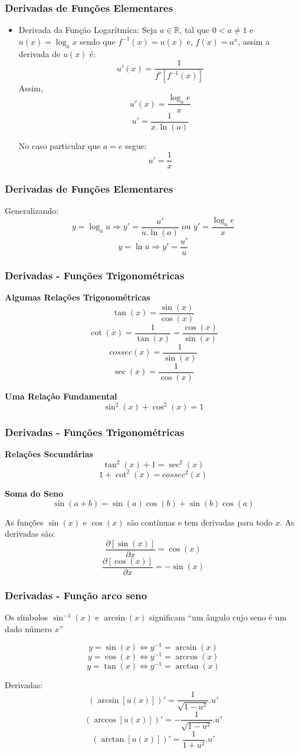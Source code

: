 \documentclass[hyperref={pdfpagelabels=false}]{beamer}
\begin{document}
\begin{frame}
\frametitle{Derivadas de Funções Elementares}
\begin{itemize}
 \item Derivada da Função Logarítmica: \pause Seja $a \in \mathbb{R}$, tal que $0 < a \neq 1$ e $u(x) = \log_{a}x$ sendo que $f^{-1}(x) = u(x)$ e, $f(x) = a^x$, assim a derivada de $u(x)$ é: $$u'(x) = \frac{1}{f'[f^{-1}(x)]}$$ \pause 
 Assim, $$u'(x) = \frac{\log_{a}e}{x}$$ $$u' = \frac{1}{x.\ln(a)}$$

No caso particular que $a = e$ segue: $$u' = \frac{1}{x}$$

\end{itemize}


\end{frame}

\begin{frame}
\frametitle{Derivadas de Funções Elementares}
Generalizando:
$$y = \log_{a}u \Rightarrow y' = \frac{u'}{u.\ln(a)} \text{ ou } y' = \frac{\log_{a}e}{x}$$ 
$$ y = \ln u \Rightarrow y' = \frac{u'}{u}$$

\end{frame}

\begin{frame}
\frametitle{Derivadas - Funções Trigonométricas}
{\bf Algumas Relações Trigonométricas}
$$\tan(x) = \frac{\sin(x)}{\cos(x)}$$
$$\cot(x) = \frac{1}{\tan(x)} = \frac{\cos(x)}{\sin(x)}$$
$$cossec(x) = \frac{1}{\sin(x)}$$
$$\sec(x) = \frac{1}{\cos(x)}$$

{\bf Uma Relação Fundamental}
$$\sin^2(x) + \cos^2(x) = 1$$

\end{frame}

\begin{frame}
\frametitle{Derivadas - Funções Trigonométricas}

{\bf Relações Secundárias}
$$\tan^2(x) + 1 = \sec^2(x)$$
$$1 + \cot^2(x) = cossec ^2(x)$$

{\bf Soma do Seno}
$$\sin(a+b) = \sin(a)\cos(b) + \sin(b)\cos(a)$$

As funções $\sin(x)$ e $\cos(x)$ são contínuas e tem derivadas para todo $x$. As derivadas são:
$$\dfrac{\partial [\sin(x)]}{\partial x} = \cos(x)$$
$$\dfrac{\partial [\cos(x)]}{\partial x} = -\sin(x)$$


\end{frame}

\begin{frame}
\frametitle{Derivadas - Função arco seno}
Os símbolos $\sin^{-1}(x)$ e $\arcsin(x)$ significam ``um ângulo cujo seno é um dado número $x$''

$$y = \sin (x) \Leftrightarrow y^{-1} = \arcsin(x)$$
$$y = \cos (x) \Leftrightarrow y^{-1} = \arccos(x)$$
$$y = \tan (x) \Leftrightarrow y^{-1} = \arctan(x)$$

Derivadas:
$$(\arcsin[u(x)])' = \frac{1}{\sqrt{1 - u^2}}.u'$$
$$(\arccos[u(x)])' = - \frac{1}{\sqrt{1 - u^2}}.u'$$
$$(\arctan[u(x)])' = \frac{1}{1+u^2}.u'$$

\end{frame}
\end{document}
